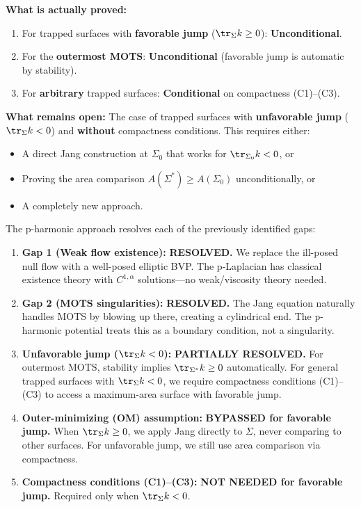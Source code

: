 \begin{remark}
\textbf{What is actually proved:}
\begin{enumerate}
\item For trapped surfaces with \textbf{favorable jump} ($\tr_\Sigma k \geq 0$): \textbf{Unconditional}.
\item For the \textbf{outermost MOTS}: \textbf{Unconditional} (favorable jump is automatic by stability).
\item For \textbf{arbitrary} trapped surfaces: \textbf{Conditional} on compactness (C1)--(C3).
\end{enumerate}

\textbf{What remains open:}
The case of trapped surfaces with \textbf{unfavorable jump} ($\tr_\Sigma k < 0$) and \textbf{without} compactness conditions. This requires either:
\begin{itemize}
\item A direct Jang construction at $\Sigma_0$ that works for $\tr_{\Sigma_0} k < 0$, or
\item Proving the area comparison $A(\Sigma^*) \geq A(\Sigma_0)$ unconditionally, or
\item A completely new approach.
\end{itemize}
\end{remark}

\begin{remark}
The p-harmonic approach resolves each of the previously identified gaps:

\begin{enumerate}
\item \textbf{Gap 1 (Weak flow existence):} \textbf{RESOLVED.} We replace the ill-posed null flow with a well-posed elliptic BVP. The p-Laplacian has classical existence theory with $C^{1,\alpha}$ solutions---no weak/viscosity theory needed.

\item \textbf{Gap 2 (MOTS singularities):} \textbf{RESOLVED.} The Jang equation naturally handles MOTS by blowing up there, creating a cylindrical end. The p-harmonic potential treats this as a boundary condition, not a singularity.

\item \textbf{Unfavorable jump ($\tr_\Sigma k < 0$):} \textbf{PARTIALLY RESOLVED.} For outermost MOTS, stability implies $\tr_{\Sigma^*} k \geq 0$ automatically. For general trapped surfaces with $\tr_\Sigma k < 0$, we require compactness conditions (C1)--(C3) to access a maximum-area surface with favorable jump.

\item \textbf{Outer-minimizing (OM) assumption:} \textbf{BYPASSED for favorable jump.} When $\tr_\Sigma k \geq 0$, we apply Jang directly to $\Sigma$, never comparing to other surfaces. For unfavorable jump, we still use area comparison via compactness.

\item \textbf{Compactness conditions (C1)--(C3):} \textbf{NOT NEEDED for favorable jump.} Required only when $\tr_\Sigma k < 0$.
\end{enumerate}
\end{remark}

